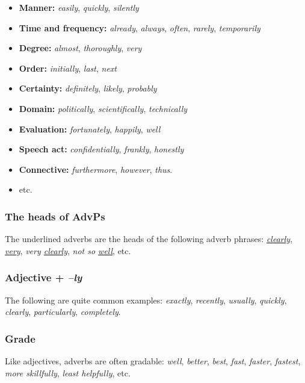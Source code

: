 \begin{itemize}
    \item \textbf{Manner:} \textit{easily}, \textit{quickly}, \textit{silently}
    \item \textbf{Time and frequency:} \textit{already}, \textit{always}, \textit{often}, \textit{rarely}, \textit{temporarily}
    \item \textbf{Degree:} \textit{almost}, \textit{thoroughly}, \textit{very}
    \item \textbf{Order:} \textit{initially}, \textit{last}, \textit{next}
    \item \textbf{Certainty:} \textit{definitely}, \textit{likely}, \textit{probably}
    \item \textbf{Domain:} \textit{politically}, \textit{scientifically}, \textit{technically}
    \item \textbf{Evaluation:} \textit{fortunately}, \textit{happily}, \textit{well}
    \item \textbf{Speech act:} \textit{confidentially}, \textit{frankly}, \textit{honestly}
    \item \textbf{Connective:} \textit{furthermore}, \textit{however}, \textit{thus}.
    \item etc.
\end{itemize}

\subsubsection*{The heads of AdvPs}
The underlined adverbs are the heads of the following adverb phrases: \textit{\uline{clearly}}, \textit{\uline{very}}, \textit{very \uline{clearly}}, \textit{not so \uline{well}}, etc.

\subsubsection*{Adjective + \textit{--ly}}
The following are quite common examples: \textit{exactly}, \textit{recently}, \textit{usually}, \textit{quickly}, \textit{clearly}, \textit{particularly}, \textit{completely}.


\subsubsection*{Grade}

Like adjectives, adverbs are often gradable: \textit{well}, \textit{better}, \textit{best}, \textit{fast}, \textit{faster}, \textit{fastest}, \textit{more skillfully}, \textit{least helpfully}, etc.

